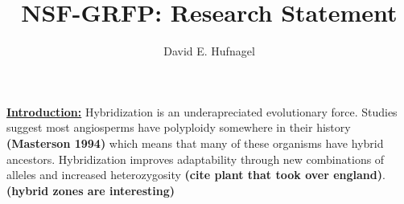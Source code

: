 \documentclass[12pt]{amsart}
\title{NSF-GRFP: Research Statement}
\author{David E. Hufnagel}
\begin{document}
\maketitle

\textbf{\underline{Introduction:} }
Hybridization is an underapreciated evolutionary force.
Studies suggest most angiosperms have polyploidy somewhere in their history \textbf{(Masterson 1994)} which means that many of these organisms have hybrid ancestors.
Hybridization improves adaptability through new combinations of alleles and increased heterozygosity \textbf{(cite plant that took over england)}. \textbf{(hybrid zones are interesting)}
\end{document}

